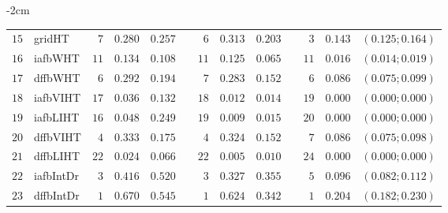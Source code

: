 \begin{table*}[!htbp]
\begin{adjustwidth*}{}{-2cm}
\begin{tabular}{@{}rlrrrrrrrrrcc@{}}
\footnotesize{$15$} & \footnotesize{gridHT   } & \footnotesize{$7 $} & \footnotesize{$0.280$} & \footnotesize{$0.257$} && \footnotesize{$6 $} & \footnotesize{$0.313$} & \footnotesize{$0.203$} && \footnotesize{$3 $} & \footnotesize{$0.143$} & \footnotesize{$(0.125;0.164)$} \\
\footnotesize{$16$} & \footnotesize{iafbWHT  } & \footnotesize{$11$} & \footnotesize{$0.134$} & \footnotesize{$0.108$} && \footnotesize{$11$} & \footnotesize{$0.125$} & \footnotesize{$0.065$} && \footnotesize{$11$} & \footnotesize{$0.016$} & \footnotesize{$(0.014;0.019)$} \\
\footnotesize{$17$} & \footnotesize{dffbWHT  } & \footnotesize{$6 $} & \footnotesize{$0.292$} & \footnotesize{$0.194$} && \footnotesize{$7 $} & \footnotesize{$0.283$} & \footnotesize{$0.152$} && \footnotesize{$6 $} & \footnotesize{$0.086$} & \footnotesize{$(0.075;0.099)$} \\
\footnotesize{$18$} & \footnotesize{iafbVIHT } & \footnotesize{$17$} & \footnotesize{$0.036$} & \footnotesize{$0.132$} && \footnotesize{$18$} & \footnotesize{$0.012$} & \footnotesize{$0.014$} && \footnotesize{$19$} & \footnotesize{$0.000$} & \footnotesize{$(0.000;0.000)$} \\
\footnotesize{$19$} & \footnotesize{iafbLIHT } & \footnotesize{$16$} & \footnotesize{$0.048$} & \footnotesize{$0.249$} && \footnotesize{$19$} & \footnotesize{$0.009$} & \footnotesize{$0.015$} && \footnotesize{$20$} & \footnotesize{$0.000$} & \footnotesize{$(0.000;0.000)$} \\
\footnotesize{$20$} & \footnotesize{dffbVIHT } & \footnotesize{$4 $} & \footnotesize{$0.333$} & \footnotesize{$0.175$} && \footnotesize{$4 $} & \footnotesize{$0.324$} & \footnotesize{$0.152$} && \footnotesize{$7 $} & \footnotesize{$0.086$} & \footnotesize{$(0.075;0.098)$} \\
\footnotesize{$21$} & \footnotesize{dffbLIHT } & \footnotesize{$22$} & \footnotesize{$0.024$} & \footnotesize{$0.066$} && \footnotesize{$22$} & \footnotesize{$0.005$} & \footnotesize{$0.010$} && \footnotesize{$24$} & \footnotesize{$0.000$} & \footnotesize{$(0.000;0.000)$} \\
\footnotesize{$22$} & \footnotesize{iafbIntDr} & \footnotesize{$3 $} & \footnotesize{$0.416$} & \footnotesize{$0.520$} && \footnotesize{$3 $} & \footnotesize{$0.327$} & \footnotesize{$0.355$} && \footnotesize{$5 $} & \footnotesize{$0.096$} & \footnotesize{$(0.082;0.112)$} \\
\footnotesize{$23$} & \footnotesize{dffbIntDr} & \footnotesize{$1 $} & \footnotesize{$0.670$} & \footnotesize{$0.545$} && \footnotesize{$1 $} & \footnotesize{$0.624$} & \footnotesize{$0.342$} && \footnotesize{$1 $} & \footnotesize{$0.204$} & \footnotesize{$(0.182;0.230)$} \\

\end{tabular}
\end{adjustwidth*}
\end{table*}

